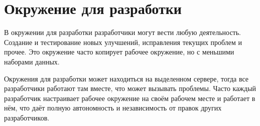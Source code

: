 \section{ Окружение для разработки } \label{sect3_9}

В окружении для разработки разработчики могут вести любую деятельность. Создание и тестирование новых улучшений, исправления текущих проблем и прочее. Это окружение часто копирует рабочее окружение, но с меньшими наборами данных.

Окружения для разработки может находиться на выделенном сервере, тогда все разработчики работают там вместе, что может вызывать проблемы. Часто каждый разработчик настраивает рабочее окружение на своём рабочем месте и работает в нём, что даёт полную автономность и независимость от правок других разработчиков.







 
 
 

 



































\clearpage




